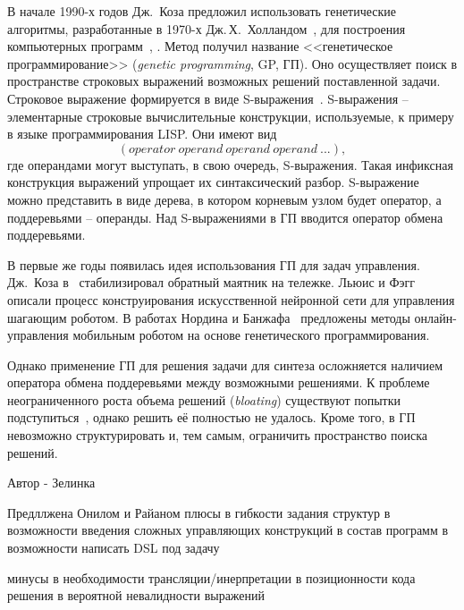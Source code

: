 В начале 1990-х годов Дж.~Коза предложил использовать генетические алгоритмы, разработанные в 1970-х Дж.\,Х.~Холландом~\cite{Holland1973, Holland1975}, для построения компьютерных программ~\cite{Koza1990, Koza1990a, Koza1992a}, .
Метод получил название <<генетическое программирование>> (\textit{genetic programming}, GP, ГП).
Оно осуществляет поиск в пространстве строковых выражений возможных решений поставленной задачи.
Строковое выражение формируется в виде S-выражения~\cite{McCarthy1960}.
S-выражения -- элементарные строковые вычислительные конструкции, используемые, к примеру в языке программирования LISP. 
Они имеют вид 
\begin{equation}
    \left(operator\ operand\ operand\ operand\ ...\right),
    \label{intro:s_expression}
\end{equation}
где операндами могут выступать, в свою очередь, S-выражения.
Такая инфиксная конструкция выражений упрощает их синтаксический разбор.
S-выражение можно представить в виде дерева, в котором корневым узлом будет оператор, а поддеревьями -- операнды.
Над S-выражениями в ГП вводится оператор обмена поддеревьями.

В первые же годы появилась идея использования ГП для задач управления.
Дж.~Коза в~\cite{Koza1992} стабилизировал обратный маятник на тележке.
Льюис и Фэгг~\cite{Lewis1992} описали процесс конструирования искусственной нейронной сети для управления шагающим роботом.
В работах Нордина и Банжафа~\cite{Nordin1996, Nordin1997} предложены методы онлайн-управления мобильным роботом на основе генетического программирования.

Однако применение ГП для решения задачи для синтеза осложняется наличием оператора обмена поддеревьями между возможными решениями. 
К проблеме неограниченного роста объема решений (\textit{bloating}) существуют попытки подступиться~\cite{Trujillo2016}, однако решить её полностью не удалось.
Кроме того, в ГП невозможно структурировать и, тем самым, ограничить пространство поиска решений.

Автор - Зелинка


Предллжена Онилом и Райаном
плюсы
в гибкости задания структур
в возможности введения сложных управляющих конструкций в состав программ
в возможности написать DSL под задачу

минусы
в необходимости трансляции/инерпретации
в позиционности кода решения
в вероятной невалидности выражений


